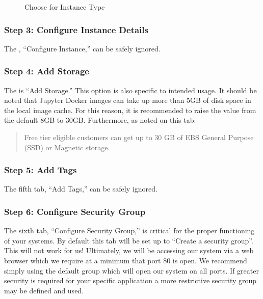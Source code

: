 \documentclass[letterpaper,10pt,english]{sphinxmanual}
\begin{document}
\begin{figure}[htbp]
\centering
\capstart

\noindent{}
\caption{Choose  for Instance Type}\label{\detokenize{02-elastic-compute-cloud:id34}}\end{figure}


\subsubsection{Step 3: Configure Instance Details}
\label{\detokenize{02-elastic-compute-cloud:Step-3:-Configure-Instance-Details}}
The , “Configure Instance,” can be safely ignored.


\subsubsection{Step 4: Add Storage}
\label{\detokenize{02-elastic-compute-cloud:Step-4:-Add-Storage}}
The  is “Add Storage.” This option is also specific to
intended usage. It should be noted that Jupyter Docker images can take
up more than 5GB of disk space in the local image cache. For this
reason, it is recommended to raise the value from the default 8GB to
30GB. Furthermore, as noted on this tab:
\begin{quote}

Free tier eligible customers can get up to 30 GB of EBS General
Purpose (SSD) or Magnetic storage.
\end{quote}


\subsubsection{Step 5: Add Tags}
\label{\detokenize{02-elastic-compute-cloud:Step-5:-Add-Tags}}
The fifth tab, “Add Tags,” can be safely ignored.


\subsubsection{Step 6: Configure Security Group}
\label{\detokenize{02-elastic-compute-cloud:Step-6:-Configure-Security-Group}}
The sixth tab, “Configure Security Group,” is critical for the proper
functioning of your systems. By default this tab will be set up to
“Create a  security group”. This will not work for us!
Ultimately, we will be accessing our system via a web browser which we
require at a minimum that port 80 is open. We recommend simply using the
default group which will open our system on all ports. If greater
security is required for your specific application a more restrictive
security group may be defined and used.
\end{document}
